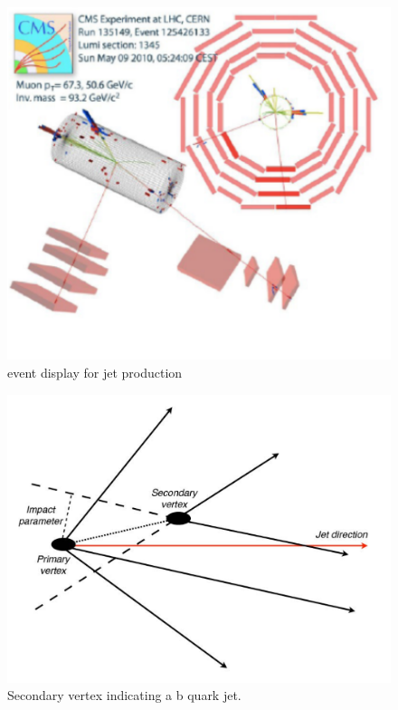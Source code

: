 \begin{figure}[h]
\centering\includegraphics[scale=0.5]{./protonprotoncollisions/Pictures/fig10.pdf}
\caption{event display for jet production}
\label{fig:jetdis2}
\end{figure}

\begin{figure}[h]
\centering\includegraphics[scale=0.5]{./protonprotoncollisions/Pictures/b-tagging-1.pdf}
\caption{Secondary vertex indicating a b quark jet.}
\label{fig:jetbtag}
\end{figure}


